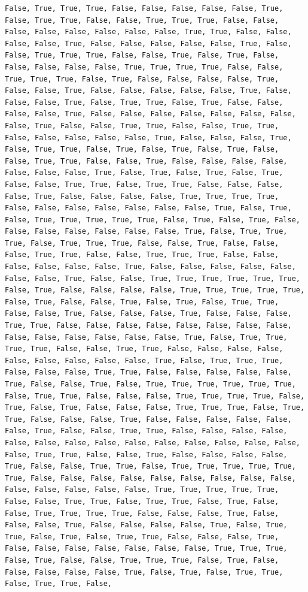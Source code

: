 \documentclass[
  letterpaper,
  DIV=11,
  numbers=noendperiod]{scrartcl}
\begin{document}
\begin{verbatim}
False, True, True, True, False, False, False, False, False, True, False, True, True, False, False, True, True, True, False, False, False, False, False, False, False, False, True, True, False, False, False, False, True, False, False, False, False, False, True, False, False, True, True, True, False, False, True, False, True, False, False, False, False, False, True, True, True, True, False, False, True, True, True, False, True, False, False, False, False, True, False, False, True, False, False, False, False, False, True, False, False, False, True, False, True, True, False, True, False, False, False, False, True, False, False, False, False, False, False, False, False, True, False, False, True, True, False, False, True, True, False, False, False, False, False, True, False, False, False, True, False, True, True, False, True, False, True, False, True, False, False, True, True, False, False, True, False, False, False, False, False, False, False, True, False, True, False, True, False, True, False, False, True, True, False, True, True, False, False, False, False, True, False, False, False, False, True, True, True, True, False, False, False, False, False, False, False, True, False, True, False, True, True, True, True, True, False, True, False, True, False, False, False, False, False, False, False, True, False, True, True, True, False, True, True, True, False, False, True, False, False, False, True, True, False, False, True, True, True, False, False, False, False, False, False, True, False, False, False, False, False, False, False, True, False, False, True, True, True, True, True, True, False, True, False, False, False, False, True, True, True, True, True, False, True, False, False, True, False, True, False, True, True, False, False, True, False, False, False, True, False, False, False, True, True, False, False, False, False, False, False, False, False, False, False, False, False, False, False, True, False, True, True, True, True, False, False, True, True, False, False, False, False, False, False, False, False, False, True, False, True, True, True, False, False, False, True, True, False, False, False, False, False, True, False, False, True, False, True, True, True, True, True, True, False, True, True, False, False, False, True, True, True, True, False, True, False, True, False, False, False, True, True, True, False, True, True, False, False, False, True, False, False, False, False, False, False, True, False, False, True, True, False, False, False, False, False, False, False, False, False, False, False, False, False, False, False, True, True, False, False, True, False, False, False, False, True, False, False, True, True, False, True, True, True, True, True, True, False, False, False, False, False, False, False, False, False, False, False, False, False, False, True, True, True, True, True, False, False, True, True, False, True, True, False, True, False, False, True, True, True, True, False, False, False, True, False, False, False, True, False, False, False, False, True, False, True, True, False, True, False, True, True, False, False, False, True, False, False, False, False, False, False, False, True, True, True, False, True, False, False, True, True, True, False, True, False, False, False, False, False, True, False, True, False, True, True, False, True, True, False, 
\end{verbatim}
\end{document}
